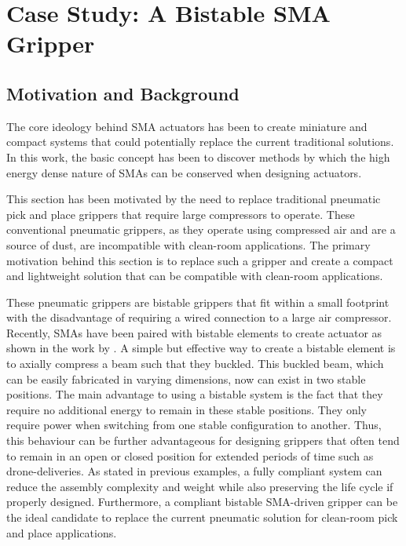 
\section{Case Study: A Bistable SMA Gripper}\label{sec:smabb-gripper}
\subsection{Motivation and Background}
The core ideology behind SMA actuators has been to create miniature and compact systems that could potentially replace the current traditional solutions. In this work, the basic concept has been to discover methods by which the high energy dense nature of SMAs can be conserved when designing actuators.

This section has been motivated by the need to replace traditional pneumatic pick and place grippers that require large compressors to operate. These conventional pneumatic grippers, as they operate using compressed air and are a source of dust, are incompatible with clean-room applications. The primary motivation behind this section is to replace such a gripper and create a compact and lightweight solution that can be compatible with clean-room applications.

These pneumatic grippers are bistable grippers that fit within a small footprint with the disadvantage of requiring a wired connection to a large air compressor. Recently, SMAs have been paired with bistable elements to create actuator as shown in the work by \todocite. A simple but effective way to create a bistable element is to axially compress a beam such that they buckled. This buckled beam, which can be easily fabricated in varying dimensions, now can exist in two stable positions. The main advantage to using a bistable system is the fact that they require no additional energy to remain in these stable positions. They only require power when switching from one stable configuration to another. Thus, this behaviour can be further advantageous for designing grippers that often tend to remain in an open or closed position for extended periods of time such as drone-deliveries. As stated in previous examples, a fully compliant system can reduce the assembly complexity and weight while also preserving the life cycle if properly designed. Furthermore, a compliant bistable SMA-driven gripper can be the ideal candidate to replace the current pneumatic solution for clean-room pick and place applications.
